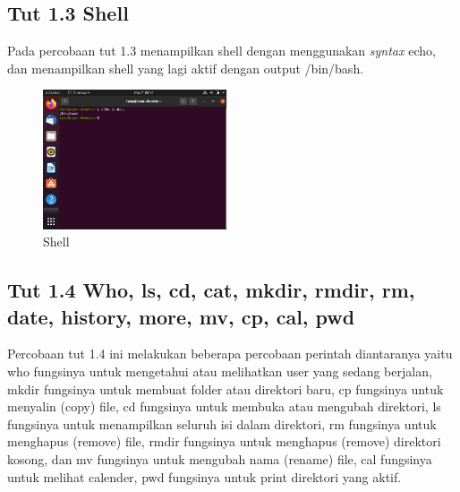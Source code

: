 \documentclass[11pt,a4paper]{article}
\begin{document}
\subsection{Tut 1.3 Shell}
    Pada percobaan tut 1.3 menampilkan shell dengan menggunakan \textit{syntax} echo, dan menampilkan shell yang lagi aktif dengan output /bin/bash.
    \begin{figure}[h]
     \centering
    \includegraphics[width=0.5\textwidth]{Gambar/tut 1.3 echo-shell.png}
    \caption{Shell}
    \label{fig:my_label}
    \end{figure}
   \newpage
    
\subsection{Tut 1.4 Who, ls, cd, cat, mkdir, rmdir, rm, date, history, more, mv, cp, cal, pwd}
    Percobaan tut 1.4 ini melakukan beberapa percobaan perintah diantaranya yaitu who fungsinya untuk mengetahui atau melihatkan user yang sedang berjalan, mkdir fungsinya untuk membuat folder atau direktori baru, cp fungsinya untuk menyalin (copy) file, cd fungsinya untuk membuka atau mengubah direktori, ls fungsinya untuk menampilkan seluruh isi dalam direktori, rm fungsinya untuk menghapus (remove) file, rmdir fungsinya untuk menghapus (remove) direktori kosong, dan mv fungsinya untuk mengubah nama (rename) file, cal fungsinya untuk melihat calender, pwd fungsinya untuk print direktori yang aktif.
\end{document}
